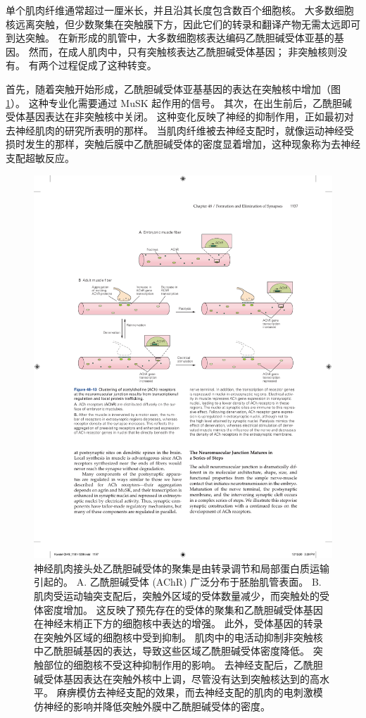 单个肌肉纤维通常超过一厘米长，并且沿其长度包含数百个细胞核。 大多数细胞核远离突触，但少数聚集在突触膜下方，因此它们的转录和翻译产物无需太远即可到达突触。 在新形成的肌管中，大多数细胞核表达编码乙酰胆碱受体亚基的基因。 然而，在成人肌肉中，只有突触核表达乙酰胆碱受体基因； 非突触核则没有。 有两个过程促成了这种转变。

首先，随着突触开始形成，乙酰胆碱受体亚基基因的表达在突触核中增加（图 \ref{fig:48_13}）。 
这种专业化需要通过 MuSK 起作用的信号。 其次，在出生前后，乙酰胆碱受体基因表达在非突触核中关闭。 这种变化反映了神经的抑制作用，正如最初对去神经肌肉的研究所表明的那样。 当肌肉纤维被去神经支配时，就像运动神经受损时发生的那样，突触后膜中乙酰胆碱受体的密度显着增加，这种现象称为去神经支配超敏反应。

\begin{figure}[htbp]
	\centering
	\includegraphics[width=0.9\linewidth]{chap48/fig_48_13}
	\caption{神经肌肉接头处乙酰胆碱受体的聚集是由转录调节和局部蛋白质运输引起的。 A. 乙酰胆碱受体 (AChR) 广泛分布于胚胎肌管表面。 B. 肌肉受运动轴突支配后，突触外区域的受体数量减少，而突触处的受体密度增加。 这反映了预先存在的受体的聚集和乙酰胆碱受体基因在神经末梢正下方的细胞核中表达的增强。 此外，受体基因的转录在突触外区域的细胞核中受到抑制。 肌肉中的电活动抑制非突触核中乙酰胆碱基因的表达，导致这些区域乙酰胆碱受体密度降低。 突触部位的细胞核不受这种抑制作用的影响。 去神经支配后，乙酰胆碱受体基因表达在突触外核中上调，尽管没有达到突触核达到的高水平。 麻痹模仿去神经支配的效果，而去神经支配的肌肉的电刺激模仿神经的影响并降低突触外膜中乙酰胆碱受体的密度。}
	\label{fig:48_13}
\end{figure}

